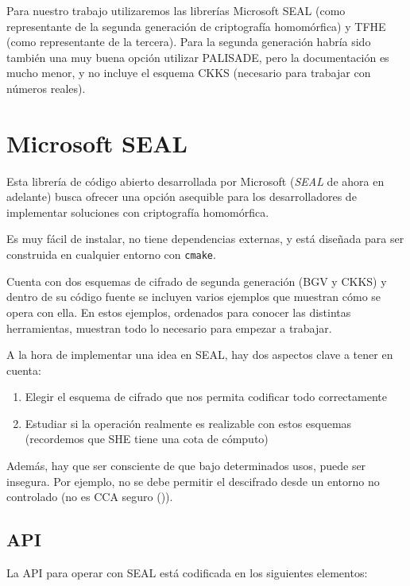 Para nuestro trabajo utilizaremos las librerías Microsoft SEAL (como representante de la segunda generación de criptografía homomórfica) y TFHE (como representante de la tercera). Para la segunda generación habría sido también una muy buena opción utilizar PALISADE, pero la documentación es mucho menor, y no incluye el esquema CKKS (necesario para trabajar con números reales).

\section{Microsoft SEAL}
\label{tag:msfseal}

Esta librería de código abierto desarrollada por Microsoft (\textit{SEAL} de ahora en adelante) busca ofrecer una opción asequible para los desarrolladores de implementar soluciones con criptografía homomórfica.

Es muy fácil de instalar, no tiene dependencias externas, y está diseñada para ser construida en cualquier entorno con \verb|cmake|.

Cuenta con dos esquemas de cifrado de segunda generación (BGV y CKKS) y dentro de su código fuente se incluyen varios ejemplos que muestran cómo se opera con ella. En estos ejemplos, ordenados para conocer las distintas herramientas, muestran todo lo necesario para empezar a trabajar.

A la hora de implementar una idea en SEAL, hay dos aspectos clave a tener en cuenta:

\begin{enumerate}
  \item Elegir el esquema de cifrado que nos permita codificar todo correctamente
  \item Estudiar si la operación realmente es realizable con estos esquemas (recordemos que SHE tiene una cota de cómputo)
\end{enumerate}

Además, hay que ser consciente de que bajo determinados usos, puede ser insegura. Por ejemplo, no se debe permitir el descifrado desde un entorno no controlado (no es CCA seguro (\cite{peng_danger_2019})).

\subsection{API}

La API para operar con SEAL está codificada en los siguientes elementos:


